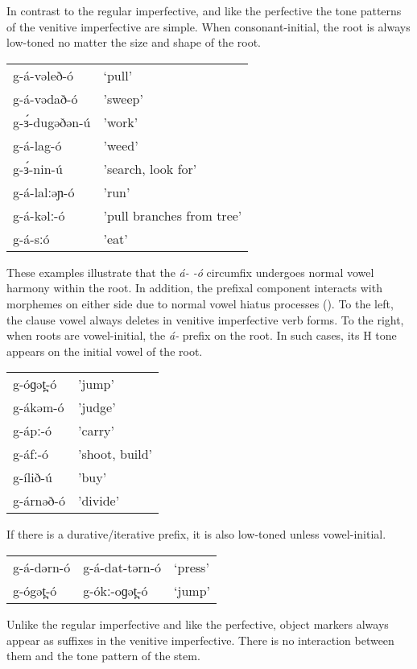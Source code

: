 In contrast to the regular imperfective, and like the perfective the tone patterns of the venitive imperfective are simple. When consonant-initial, the root is always low-toned no matter the size and shape of the root.

\ea 
\begin{tabular}[t]{ll}
g-á-vəleð-ó		&	‘pull’\\
g-á-vədað-ó		&	'sweep'\\
g-ɜ́-dugəðən-ú	&	'work'\\
g-á-lag-ó		&	'weed'\\
g-ɜ́-nin-ú		&	'search, look for'\\
g-á-lalːəɲ-ó	&	'run'\\
g-á-kəlː-ó		&	'pull branches from tree'\\
g-á-sːó			&	'eat'\\ 
\end{tabular}
\z 
These examples illustrate that the \textit{á- -ó} circumfix undergoes normal vowel harmony within the root. In addition, the prefixal component interacts with morphemes on either side due to normal vowel hiatus processes (). To the left, the clause vowel always deletes in venitive imperfective verb forms. %
To the right, when roots are vowel-initial, the \textit{á-} prefix on the root. In such cases, its H tone appears on the initial vowel of the root.

\ea 
\begin{tabular}[t]{ll}
g-óɡət̪-ó	&	'jump'\\
g-ákəm-ó	&	'judge'\\
g-ápː-ó		&	'carry'\\
g-áfː-ó		&	'shoot, build'\\
g-ílið-ú	&	'buy'\\
g-árnəð-ó	&	'divide'\\ 	
\end{tabular}
\z 

If there is a durative/iterative prefix, it is also low-toned unless vowel-initial.

\ea 
\begin{tabular}[t]{lll}
g-á-dərn-ó	&	g-á-dat-tərn-ó	&	‘press’\\
g-ógət̪-ó	&	g-ókː-oɡət̪-ó	&	‘jump’\\ 	
\end{tabular}
\z  


Unlike the regular imperfective and like the perfective, object markers always appear as suffixes in the venitive imperfective. There is no interaction between them and the tone pattern of the stem.  

